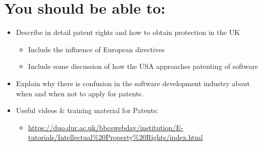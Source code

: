 \documentclass{article}
\begin{document}
\section{You should be able to:}
\begin{itemize}
\item Describe in detail patent rights and how to obtain protection in the UK
\begin{itemize}
\item Include the influence of European directives
\item Include some discussion of how the USA approaches patenting of software
\end{itemize}

\item Explain why there is confusion in the software development industry about when and when not to apply for patents.

\item Useful videos \& training material for Patents:
\begin{itemize}
\item \url{https://duo.dur.ac.uk/bbcswebdav/institution/E-tutorials/Intellectual\%20Property\%20Rights/index.html}
\end{itemize}
\end{itemize}
\end{document}
